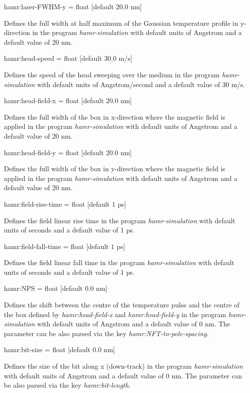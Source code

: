 {\zicf hamr:laser-FWHM-y = float [default $20.0$ nm]}
Defines the full width at half maximum of the Gaussian temperature profile in y-direction
in the program \textit{hamr-simulation} with default units of Angstrom and a default value of 20 nm.

{\zicf hamr:head-speed = float [default $30.0$ m/s]}
Defines the speed of the head sweeping over the medium
in the program \textit{hamr-simulation} with default units of Angstrom/second and a default value of 30 m/s.

{\zicf hamr:head-field-x = float [default $20.0$ nm]}
Defines the full width of the box in x-direction where the magnetic field is applied
in the program \textit{hamr-simulation} with default units of Angstrom and a default value of 20 nm.

{\zicf hamr:head-field-y = float [default $20.0$ nm]}
Defines the full width of the box in y-direction where the magnetic field is applied
in the program \textit{hamr-simulation} with default units of Angstrom and a default value of 20 nm.

{\zicf hamr:field-rise-time = float [default $1$ ps]}
Defines the field linear rise time in the program \textit{hamr-simulation} with default units of seconds and a default value of 1 ps.

{\zicf hamr:field-fall-time = float [default $1$ ps]}
Defines the field linear fall time in the program \textit{hamr-simulation} with default units of seconds and a default value of 1 ps.

{\zicf hamr:NPS = float [default $0.0$ nm]}
Defines the shift between the centre of the temperature pulse and the centre of the box defined by \textit{hamr:head-field-x} and \textit{hamr:head-field-y}
in the program \textit{hamr-simulation} with default units of Angstrom and a default value of 0 nm.
The parameter can be also parsed via the key \textit{hamr:NFT-to-pole-spacing}.

{\zicf hamr:bit-size = float [default $0.0$ nm]}
Defines the size of the bit along x (down-track)
in the program \textit{hamr-simulation} with default units of Angstrom and a default value of 0 nm.
The parameter can be also parsed via the key \textit{hamr:bit-length}.

